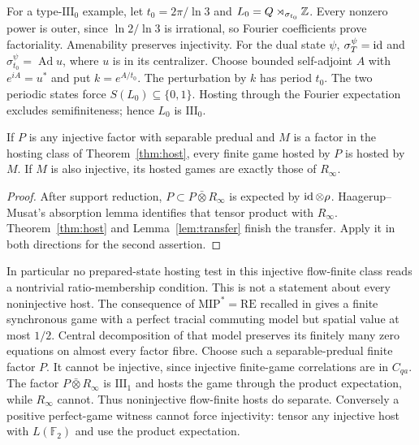 For a type-$\mathrm{III}_0$ example, let $t_0=2\pi/\ln3$ and $L_0=Q\rtimes_{\sigma_{t_0}}\mathbb Z$. Every nonzero power is outer, since $\ln2/\ln3$ is irrational, so Fourier coefficients prove factoriality. Amenability preserves injectivity. For the dual state $\psi$, $\sigma_T^\psi=\operatorname{id}$ and $\sigma_{t_0}^\psi=\operatorname{Ad}u$, where $u$ is in its centralizer. Choose bounded self-adjoint $A$ with $e^{iA}=u^*$ and put $k=e^{A/t_0}$. The perturbation by $k$ has period $t_0$. The two periodic states force $S(L_0)\subseteq\{0,1\}$. Hosting through the Fourier expectation excludes semifiniteness; hence $L_0$ is $\mathrm{III}_0$.

\begin{proposition}\label{prop:blind}
If $P$ is any injective factor with separable predual and $M$ is a factor in the hosting class of Theorem~\ref{thm:host}, every finite game hosted by $P$ is hosted by $M$. If $M$ is also injective, its hosted games are exactly those of $R_\infty$.
\end{proposition}
\begin{proof}
After support reduction, $P\subset P\bar\otimes R_\infty$ is expected by $\operatorname{id}\otimes\rho$. Haagerup--Musat's absorption lemma \cite[Lemma 3.8]{HM} identifies that tensor product with $R_\infty$. Theorem~\ref{thm:host} and Lemma~\ref{lem:transfer} finish the transfer. Apply it in both directions for the second assertion.
\end{proof}
In particular no prepared-state hosting test in this injective flow-finite class reads a nontrivial ratio-membership condition. This is not a statement about every noninjective host. The consequence of $\mathrm{MIP}^*=\mathrm{RE}$ recalled in \cite{JNVWY,Tensor} gives a finite synchronous game with a perfect tracial commuting model but spatial value at most $1/2$. Central decomposition of that model preserves its finitely many zero equations on almost every factor fibre. Choose such a separable-predual finite factor $P$. It cannot be injective, since injective finite-game correlations are in $C_{qa}$. The factor $P\bar\otimes R_\infty$ is $\mathrm{III}_1$ and hosts the game through the product expectation, while $R_\infty$ cannot. Thus noninjective flow-finite hosts do separate. Conversely a positive perfect-game witness cannot force injectivity: tensor any injective host with $L(\mathbb F_2)$ and use the product expectation.

